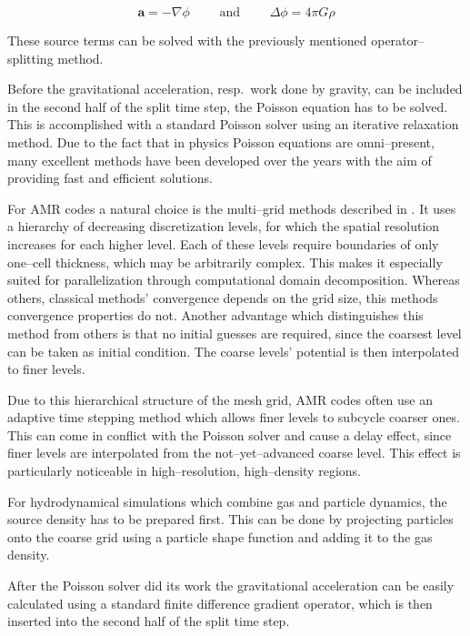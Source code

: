 \begin{equation}
  \textbf{a} = -\nabla\phi \qquad\text{ and }\qquad \Delta\phi = 4\pi G\rho
\end{equation}

These source terms can be solved with the previously mentioned operator--splitting method.

Before the gravitational acceleration, resp.~work done by gravity, can be included in the second half of the split time step, the Poisson equation has to be solved.
This is accomplished with a standard Poisson solver using an iterative relaxation method.
Due to the fact that in physics Poisson equations are omni--present, many excellent methods have been developed over the years with the aim of providing fast and efficient solutions.

For AMR codes a natural choice is the multi--grid methods described in \citet{Multigrid_Poisson}.
It uses a hierarchy of decreasing discretization levels, for which the spatial resolution increases for each higher level.
Each of these levels require boundaries of only one--cell thickness, which may be arbitrarily complex.
This makes it especially suited for parallelization through computational domain decomposition.
Whereas others, classical methods' convergence depends on the grid size, this methods convergence properties do not.
Another advantage which distinguishes this method from others is that no initial guesses are required, since the coarsest level can be taken as initial condition.
The coarse levels' potential is then interpolated to finer levels.

Due to this hierarchical structure of the mesh grid, AMR codes often use an adaptive time stepping method which allows finer levels to subcycle coarser ones.
This can come in conflict with the Poisson solver and cause a delay effect, since finer levels are interpolated from the not--yet--advanced coarse level.
This effect is particularly noticeable in high--resolution, high--density regions.

For hydrodynamical simulations which combine gas and particle dynamics, the source density has to be prepared first.
This can be done by projecting particles onto the coarse grid using a particle shape function and adding it to the gas density.

After the Poisson solver did its work the gravitational acceleration can be easily calculated using a standard finite difference gradient operator, which is then inserted into the second half of the split time step.


